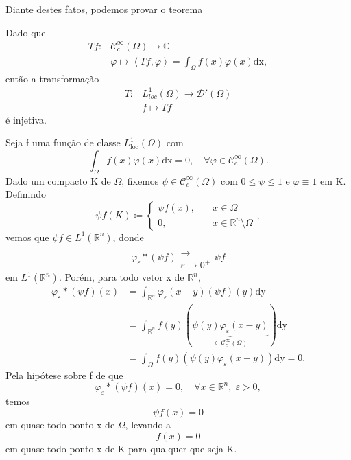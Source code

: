 \documentclass[../distribution_theory_notes.tex]{subfiles}
\begin{document}
       Diante destes fatos, podemos provar o teorema 
      \begin{theorem*}
        Dado que 
       \begin{align*}
           Tf:&\mathcal{C}_{c}^{\infty}(\Omega )\rightarrow \mathbb{C} \\
              &\varphi \longmapsto \left< Tf, \varphi  \right>=\int_{\Omega }^{}f(x)\varphi (x) \mathrm{dx},
       \end{align*}
       então a transformação 
      \begin{align*}
          T:&L_{loc}^{1}(\Omega )\rightarrow \mathcal{D}'(\Omega )\\
             &f\longmapsto Tf
      \end{align*}
      é injetiva.
      \end{theorem*}
     \begin{proof*}
       Seja f uma função de classe \(L_{\mathrm{loc}}^{1}(\Omega )\) com 
         \[
           \int_{\Omega }^{}f(x)\varphi (x) \mathrm{dx} = 0,\quad \forall \varphi \in \mathcal{C}_{c}^{\infty}(\Omega ).
         \]
         Dado um compacto K de \(\Omega \), fixemos \(\psi \in \mathcal{C}_{c}^{\infty}(\Omega )\) com \(0\leq \psi \leq 1\) e \(\varphi \equiv 1\) em K. Definindo 
           \[
             \psi f(K)\coloneqq \left\{\begin{array}{ll}
                 \psi f(x),  &\quad x\in \Omega \\
                 0, &\quad x\in \mathbb{R}^{n}\setminus{\Omega }
             \end{array}\right.,
           \]
           vemos que \(\psi f\in L^{1}(\mathbb{R}^{n})\), donde 
             \[
               \varphi_{\varepsilon }*(\psi f)\substack{ \\ \longrightarrow \\ \varepsilon \to 0^{+}}\psi f
             \]
             em \(L^{1}(\mathbb{R}^{n})\). Porém, para todo vetor x de \(\mathbb{R}^{n}\), 
            \begin{align*}
              \varphi_{\varepsilon }*(\psi f)(x)&= \int_{\mathbb{R}^{n}}^{}\varphi_{\varepsilon }(x-y)(\psi f)(y) \mathrm{dy}\\ 
                                                &= \int_{\mathbb{R}^{n}}^{}f(y)(\underbrace{\psi (y)\varphi_{\varepsilon }(x-y)}_{\in \mathcal{C}_{c}^{\infty}(\Omega )}) \mathrm{dy}\\ 
                                                &= \int_{\Omega }^{}f(y)(\psi (y)\varphi_{\varepsilon }(x-y)) \mathrm{dy}=0.
            \end{align*}
            Pela hipótese sobre f de que 
              \[
                \varphi_{\varepsilon }*(\psi f)(x)=0,\quad \forall x\in \mathbb{R}^{n},\; \varepsilon >0,
              \]
              temos 
                \[
                  \psi f(x)=0
                \]
                em quase todo ponto x de \(\Omega \), levando a 
                  \[
                    f(x)=0
                  \]
                  em quase todo ponto x de K para qualquer que seja K. 


\end{proof*}
\end{document}
